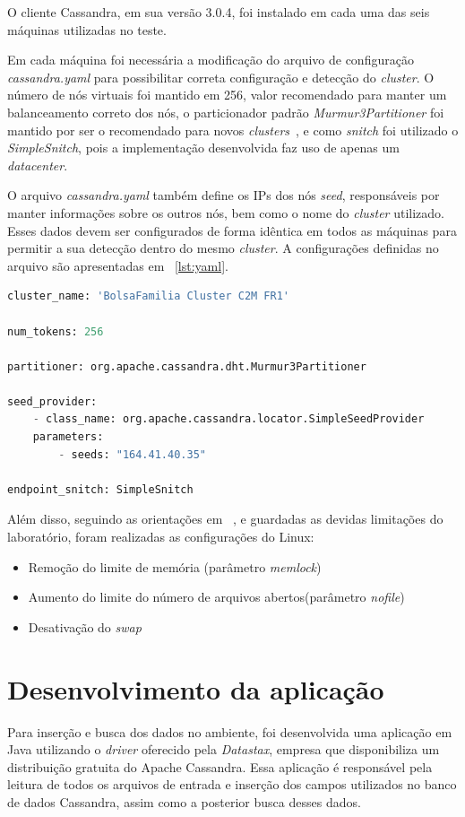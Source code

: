 O cliente Cassandra, em sua versão 3.0.4, foi instalado em cada uma das seis máquinas utilizadas no teste.

Em cada máquina foi necessária a modificação do arquivo de configuração \emph{cassandra.yaml} para possibilitar correta configuração e detecção do \emph{cluster}. O número de nós virtuais foi mantido em 256, valor recomendado para manter um balanceamento correto dos nós, o particionador padrão \emph{Murmur3Partitioner} foi mantido por ser o recomendado para novos \emph{clusters}~\cite{cassandrapartitioners}, e como \emph{snitch} foi utilizado o \emph{SimpleSnitch}, pois a implementação desenvolvida faz uso de apenas um \emph{datacenter}. 

O arquivo \emph{cassandra.yaml} também define os IPs dos nós \emph{seed}, responsáveis por manter informações sobre os outros nós, bem como o nome do \emph{cluster} utilizado. Esses dados devem ser configurados de forma idêntica em todos as máquinas para permitir a sua detecção dentro do mesmo \emph{cluster}. A configurações definidas no arquivo são apresentadas em ~\ref{lst:yaml}.

\begin{lstlisting}[caption={Configuração cassandra.yaml},label={lst:yaml},language=python]
cluster_name: 'BolsaFamilia Cluster C2M FR1'

num_tokens: 256

partitioner: org.apache.cassandra.dht.Murmur3Partitioner

seed_provider:
	- class_name: org.apache.cassandra.locator.SimpleSeedProvider
	parameters:
		- seeds: "164.41.40.35"

endpoint_snitch: SimpleSnitch

\end{lstlisting}

Além disso, seguindo as orientações em ~\cite{cassandrasettings}, e guardadas as devidas limitações do laboratório, foram realizadas as configurações do Linux:
\begin{itemize}
	\item Remoção do limite de memória (parâmetro \emph{memlock})
	\item Aumento do limite do número de arquivos abertos(parâmetro \emph{nofile})
	\item Desativação do \emph{swap}
\end{itemize}

\section{Desenvolvimento da aplicação}
Para inserção e busca dos dados no ambiente, foi desenvolvida uma aplicação em Java utilizando o \emph{driver} oferecido pela \emph{Datastax}, empresa que disponibiliza um distribuição gratuita do Apache Cassandra. Essa aplicação é responsável pela leitura de todos os arquivos de entrada e inserção dos campos utilizados no banco de dados Cassandra, assim como a posterior busca desses dados.

